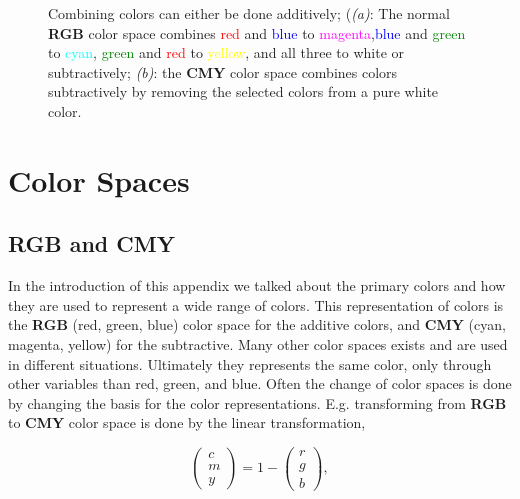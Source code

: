 \begin{figure}[H]
    \centering
    \captionsetup[subfigure]{justification=centering}
    \begin{subfigure}[b]{0.49\textwidth}
        \centering
        
		\caption{}
		\label{fig:color_additive}
    \end{subfigure}
    \begin{subfigure}[b]{0.49\textwidth}
        \centering
        
		\caption{}
		\label{fig:color_subtractive}
    \end{subfigure}
    \caption{Combining colors can either be done additively; (\textit{(a)}: The normal \textbf{RGB} color space combines \textcolor{red}{red} and \textcolor{blue}{blue} to \textcolor{magenta}{magenta},\textcolor{blue}{blue} and \textcolor{green}{green} to \textcolor{cyan}{cyan}, \textcolor{green}{green} and \textcolor{red}{red} to \textcolor{yellow}{yellow}, and all three to white or subtractively; \textit{(b)}: the \textbf{CMY} color space combines colors subtractively by removing the selected colors from a pure white color.}
    \label{fig:color_arithmetic}
\end{figure}



\section{Color Spaces}

\subsection{\textbf{RGB} and \textbf{CMY}}

In the introduction of this appendix we talked about the primary colors and how they are used to represent a wide range of colors. This representation of colors is the \textbf{RGB} (red, green, blue) color space for the additive colors, and \textbf{CMY} (cyan, magenta, yellow) for the subtractive. Many other color spaces exists and are used in different situations. Ultimately they represents the same color, only through other variables than red, green, and blue. Often the change of color spaces is done by changing the basis for the color representations. E.g. transforming from \textbf{RGB} to \textbf{CMY} color space is done by the linear transformation,

\begin{equation}
\left(\begin{array}{c}
c \\ m \\ y
\end{array}\right) = 1- \left(\begin{array}{c}
r \\ g \\ b
\end{array}\right),
\end{equation}

